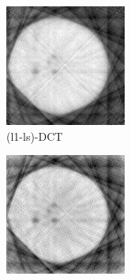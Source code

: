 \documentclass[journal]{IEEEtran}
\begin{document}
\begin{figure}[!h]
\begin{subfigure}[b]{0.24\linewidth}
        \includegraphics[width=\textwidth]{../images/potato/2D/cs_dct.png}
        \caption{(l1-ls)-DCT}
     \end{subfigure}
    \begin{subfigure}[b]{0.24\linewidth}
        \includegraphics[width=\textwidth]{../images/potato/2D/cs_wavelet.png}

\end{subfigure}
\end{figure}
\end{document}
